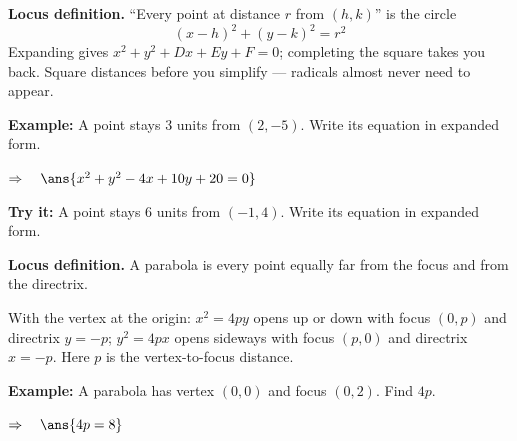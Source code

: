 \documentclass[12pt]{article}
\begin{document}


\begin{formulabox}
\textbf{Locus definition.} ``Every point at distance $r$ from $(h, k)$'' is the circle
\[ (x - h)^{2} + (y - k)^{2} = r^{2} \]
Expanding gives $x^{2} + y^{2} + Dx + Ey + F = 0$; completing the square takes you back. Square distances before you simplify --- radicals almost never need to appear.
\end{formulabox}

\begin{examplebox}
\textbf{Example:} \quad A point stays $3$ units from $(2, -5)$. Write its equation in expanded form.

$\Rightarrow\quad \ans{x^{2} + y^{2} - 4x + 10y + 20 = 0}$
\end{examplebox}

\begin{tryitbox}
\textbf{Try it:} \quad A point stays $6$ units from $(-1, 4)$. Write its equation in expanded form.\\[2pt]
\end{tryitbox}


\begin{formulabox}
\textbf{Locus definition.} A parabola is every point equally far from the focus and from the directrix.\par
With the vertex at the origin: $x^{2} = 4py$ opens up or down with focus $(0, p)$ and directrix $y = -p$; $y^{2} = 4px$ opens sideways with focus $(p, 0)$ and directrix $x = -p$. Here $p$ is the vertex-to-focus distance.
\end{formulabox}

\begin{examplebox}
\textbf{Example:} \quad A parabola has vertex $(0,0)$ and focus $(0, 2)$. Find $4p$.

$\Rightarrow\quad \ans{4p = 8}$
\end{examplebox}
\end{document}
